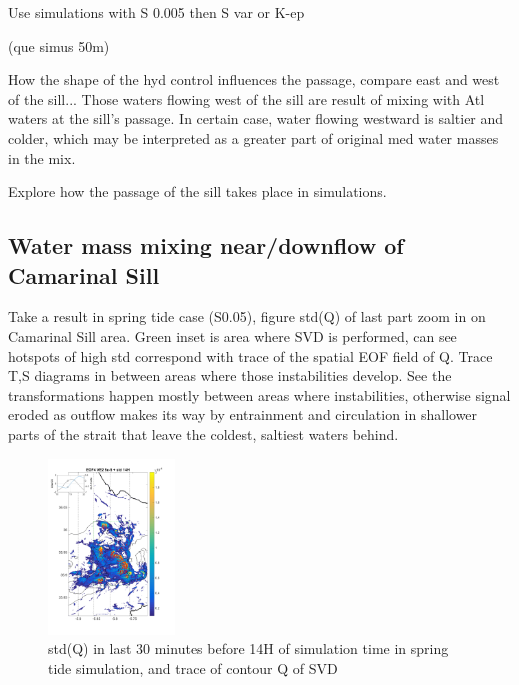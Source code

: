 Use simulations with S 0.005 then S var or K-ep

(que simus 50m)



How the shape of the hyd control influences the passage, compare east and west of the sill... 
Those waters flowing west of the sill are result of mixing with Atl waters at the sill's passage.
In certain case, water flowing westward is saltier and colder, which may be interpreted as a greater part of original med water masses in the mix.


Explore how the passage of the sill takes place in simulations.










\subsection{Water mass mixing near/downflow of Camarinal Sill}

Take a result in spring tide case (S0.05), figure std(Q) of last part zoom in on Camarinal Sill area. Green inset is area where SVD is performed, can see hotspots of high std correspond with trace of the spatial EOF field of Q. Trace T,S diagrams in between areas where those instabilities develop. See the transformations happen mostly between areas where instabilities, otherwise signal eroded as outflow makes its way by entrainment and circulation in shallower parts of the strait that leave the coldest, saltiest waters behind.

\begin{figure}[!h]
 \includegraphics[width=0.3\textwidth]{./GBR3D/EOF_std_14hCso_traces.png}
 \caption {std(Q) in last 30 minutes before 14H of simulation time in spring tide simulation, and trace of contour Q of SVD}
\end{figure}


